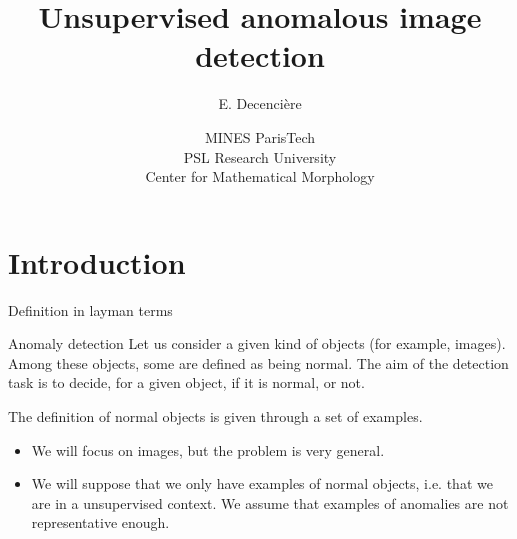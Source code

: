 \documentclass[xcolor=pdftex,dvipsnames,table,mathserif]{beamer}
\title{Unsupervised anomalous image detection}
\author{E. Decencière}
\date{MINES ParisTech\\
  PSL Research University\\
  Center for Mathematical Morphology
}
\begin{document}
\frame{\titlepage}


\section{Introduction}

\begin{frame}{Definition in layman terms}


  \begin{block}{Anomaly detection}
  Let us consider a given kind of objects (for example, images). Among these objects, some  are defined as being \alert{normal}. The aim of the detection task is to decide, for a given object, if it is normal, or not.

  The definition of normal objects is given through a set of examples.
  \end{block}

  \begin{itemize}
  \item   We will focus on images, but the problem is very general.
  \item We will suppose that we only have examples of normal objects, i.e. that we are in a \alert{unsupervised} context. We assume that examples of anomalies are not representative enough.
  \end{itemize}



\end{frame}
\end{document}

